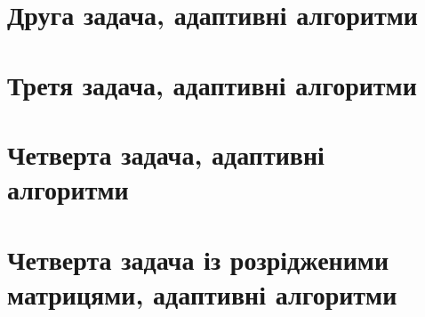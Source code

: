 
\section{Друга задача, адаптивні алгоритми}



\section{Третя задача, адаптивні алгоритми}



\section{Четверта задача, адаптивні алгоритми}



\section{Четверта задача із розрідженими матрицями, адаптивні алгоритми}


